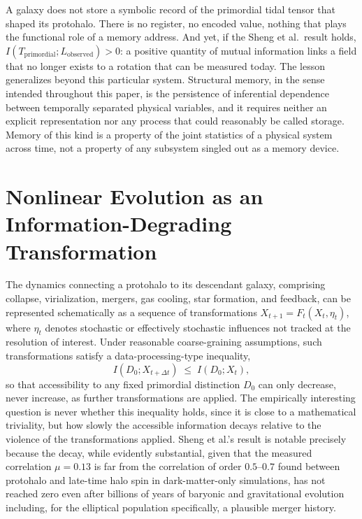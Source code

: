\documentclass[11pt]{article}
\begin{document}
A galaxy does not store a symbolic record of the primordial tidal tensor that shaped its protohalo. There is no register, no encoded value, nothing that plays the functional role of a memory address. And yet, if the Sheng et al.\ result holds, $I(T_{\mathrm{primordial}}; L_{\mathrm{observed}}) > 0$: a positive quantity of mutual information links a field that no longer exists to a rotation that can be measured today. The lesson generalizes beyond this particular system. Structural memory, in the sense intended throughout this paper, is the persistence of inferential dependence between temporally separated physical variables, and it requires neither an explicit representation nor any process that could reasonably be called storage. Memory of this kind is a property of the joint statistics of a physical system across time, not a property of any subsystem singled out as a memory device.

\section{Nonlinear Evolution as an Information-Degrading Transformation}

The dynamics connecting a protohalo to its descendant galaxy, comprising collapse, virialization, mergers, gas cooling, star formation, and feedback, can be represented schematically as a sequence of transformations $X_{t+1} = F_t(X_t, \eta_t)$, where $\eta_t$ denotes stochastic or effectively stochastic influences not tracked at the resolution of interest. Under reasonable coarse-graining assumptions, such transformations satisfy a data-processing-type inequality,
\begin{equation}
I(D_0; X_{t+\Delta t}) \;\leq\; I(D_0; X_t),
\end{equation}
so that accessibility to any fixed primordial distinction $D_0$ can only decrease, never increase, as further transformations are applied. The empirically interesting question is never whether this inequality holds, since it is close to a mathematical triviality, but how slowly the accessible information decays relative to the violence of the transformations applied. Sheng et al.'s result is notable precisely because the decay, while evidently substantial, given that the measured correlation $\mu = 0.13$ is far from the correlation of order $0.5$–$0.7$ found between protohalo and late-time halo spin in dark-matter-only simulations, has not reached zero even after billions of years of baryonic and gravitational evolution including, for the elliptical population specifically, a plausible merger history.
\end{document}
